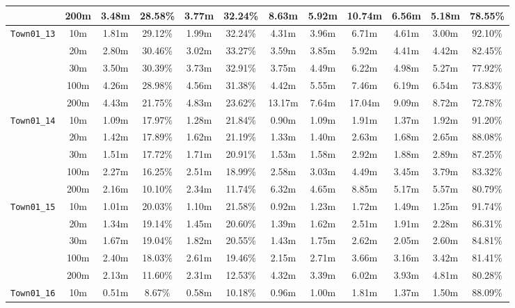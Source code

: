 \begin{table}
{\begin{tabular}{@{}cccccccccccc@{}}
      & 200m & 3.48m & 28.58\% & 3.77m & 32.24\% & 8.63m & 5.92m & 10.74m & 6.56m & 5.18m & 78.55\% \\
      \midrule
      \multirow{5}{*}{\Verb|Town01_13|} & 10m & 1.81m & 29.12\% & 1.99m & 32.24\% & 4.31m & 3.96m & 6.71m & 4.61m & 3.00m & 92.10\% \\
      & 20m & 2.80m & 30.46\% & 3.02m & 33.27\% & 3.59m & 3.85m & 5.92m & 4.41m & 4.42m & 82.45\% \\
      & 30m & 3.50m & 30.39\% & 3.73m & 32.91\% & 3.75m & 4.49m & 6.22m & 4.98m & 5.27m & 77.92\% \\
      & 100m & 4.26m & 28.98\% & 4.56m & 31.38\% & 4.42m & 5.55m & 7.46m & 6.19m & 6.54m & 73.83\% \\
      & 200m & 4.43m & 21.75\% & 4.83m & 23.62\% & 13.17m & 7.64m & 17.04m & 9.09m & 8.72m & 72.78\% \\
      \midrule
      \multirow{5}{*}{\Verb|Town01_14|} & 10m & 1.09m & 17.97\% & 1.28m & 21.84\% & 0.90m & 1.09m & 1.91m & 1.37m & 1.92m & 91.20\% \\
      & 20m & 1.42m & 17.89\% & 1.62m & 21.19\% & 1.33m & 1.40m & 2.63m & 1.68m & 2.65m & 88.08\% \\
      & 30m & 1.51m & 17.72\% & 1.71m & 20.91\% & 1.53m & 1.58m & 2.92m & 1.88m & 2.89m & 87.25\% \\
      & 100m & 2.27m & 16.25\% & 2.51m & 18.99\% & 2.58m & 3.03m & 4.49m & 3.45m & 3.79m & 83.32\% \\
      & 200m & 2.16m & 10.10\% & 2.34m & 11.74\% & 6.32m & 4.65m & 8.85m & 5.17m & 5.57m & 80.79\% \\
      \midrule
      \multirow{5}{*}{\Verb|Town01_15|} & 10m & 1.01m & 20.03\% & 1.10m & 21.58\% & 0.92m & 1.23m & 1.72m & 1.49m & 1.25m & 91.74\% \\
      & 20m & 1.34m & 19.14\% & 1.45m & 20.60\% & 1.39m & 1.62m & 2.51m & 1.91m & 2.28m & 86.31\% \\
      & 30m & 1.67m & 19.04\% & 1.82m & 20.55\% & 1.43m & 1.75m & 2.62m & 2.05m & 2.60m & 84.81\% \\
      & 100m & 2.40m & 18.03\% & 2.61m & 19.46\% & 2.15m & 2.71m & 3.66m & 3.16m & 3.42m & 81.41\% \\
      & 200m & 2.13m & 11.60\% & 2.31m & 12.53\% & 4.32m & 3.39m & 6.02m & 3.93m & 4.81m & 80.28\% \\
      \midrule
      \multirow{5}{*}{\Verb|Town01_16|} & 10m & 0.51m & 8.67\% & 0.58m & 10.18\% & 0.96m & 1.00m & 1.81m & 1.37m & 1.50m & 88.09\% \\

\end{tabular}}
\end{table}
